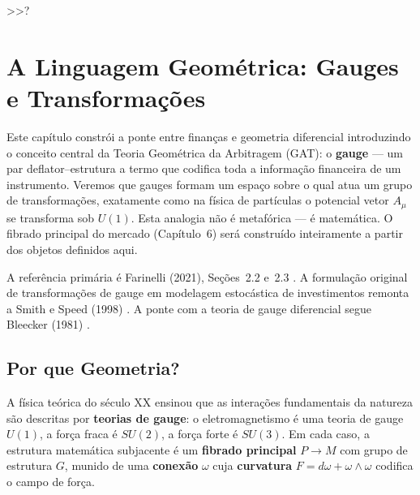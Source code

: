  >>?%
\chapter{A Linguagem Geom\'etrica: Gauges e Transforma\c{c}\~oes}

Este cap\'itulo constr\'oi a ponte entre finan\c{c}as e geometria
diferencial introduzindo o conceito central da Teoria Geom\'etrica da
Arbitragem (GAT): o \textbf{gauge} --- um par deflator--estrutura a
termo que codifica toda a informa\c{c}\~ao financeira de um instrumento.
Veremos que gauges formam um espa\c{c}o sobre o qual atua um grupo de
transforma\c{c}\~oes, exatamente como na f\'isica de part\'iculas o
potencial vetor $A_\mu$ se transforma sob $U(1)$. Esta analogia n\~ao
\'e metaf\'orica --- \'e matem\'atica. O fibrado principal do mercado
(Cap\'itulo~6) ser\'a constru\'ido inteiramente a partir dos objetos
definidos aqui.

A refer\^encia prim\'aria \'e Farinelli (2021), Se\c{c}\~oes~2.2 e~2.3
\cite{farinelli2021}. A formula\c{c}\~ao original de transforma\c{c}\~oes
de gauge em modelagem estoc\'astica de investimentos remonta a Smith e
Speed (1998) \cite{smith1998gauge}. A ponte com a teoria de gauge
diferencial segue Bleecker (1981) \cite{bleecker1981}.

\section{Por que Geometria?}

A f\'isica te\'orica do s\'eculo XX ensinou que as intera\c{c}\~oes
fundamentais da natureza s\~ao descritas por \textbf{teorias de gauge}:
o eletromagnetismo \'e uma teoria de gauge $U(1)$, a for\c{c}a fraca
\'e $SU(2)$, a for\c{c}a forte \'e $SU(3)$. Em cada caso, a
estrutura matem\'atica subjacente \'e um \textbf{fibrado principal}
$P \to M$ com grupo de estrutura $G$, munido de uma \textbf{conex\~ao}
$\omega$ cuja \textbf{curvatura} $F = d\omega + \omega \wedge \omega$
codifica o campo de for\c{c}a.

